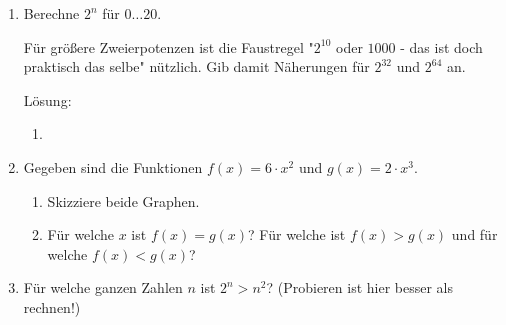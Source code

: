 \documentclass[../main.tex]{subfiles}
\begin{document}
\begin{enumerate}
	\item Berechne \begin{math}
		      2^n
	      \end{math} für \begin{math}
		      0 \dots 20
	      \end{math}.

	      Für größere Zweierpotenzen ist die Faustregel "\begin{math}
		      2^{10}
	      \end{math} oder \begin{math}
		      1000
	      \end{math} - das ist doch praktisch das selbe" nützlich.
	      Gib damit Näherungen für \begin{math}
		      2^{32}
	      \end{math} und \begin{math}
		      2^{64}
	      \end{math} an.

	      Lösung:
	      \begin{enumerate}
		      \item
	      \end{enumerate}
	\item Gegeben sind die Funktionen \begin{math}
		      f(x) = 6 \cdot x^2
	      \end{math} und \begin{math}
		      g(x) = 2 \cdot x^3
	      \end{math}.
	      \begin{enumerate}
		      \item Skizziere beide Graphen.
		      \item Für welche \begin{math}
			            x
		            \end{math} ist \begin{math}
			            f(x) = g(x)
		            \end{math}?
		            Für welche ist \begin{math}
			            f(x) > g(x)
		            \end{math} und für welche \begin{math}
			            f(x) < g(x)
		            \end{math}?
	      \end{enumerate}
	\item Für welche ganzen Zahlen \begin{math}
		      n
	      \end{math} ist \begin{math}
		      2^n > n^2
	      \end{math}? (Probieren ist hier besser als rechnen!)


\end{enumerate}
\end{document}
